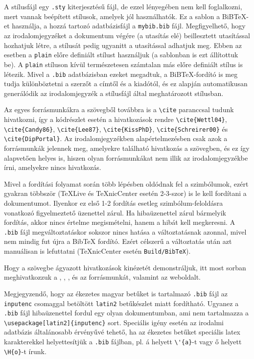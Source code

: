A stílusfájl egy \verb+.sty+ kiterjesztésű fájl, de ezzel lényegében nem kell foglalkozni, mert vannak beépített stílusok, amelyek jól használhatók. Ez a sablon a BiB\TeX-et használja, a hozzá tartozó adatbázisfájl a \verb+mybib.bib+ fájl. Megfigyelhető, hogy az irodalomjegyzéket a dokumentum végére (a \verb++ utasítás elé) beillesztett \verb++ utasítással hozhatjuk létre, a stílusát pedig ugyanitt a  \verb++ utasítással adhatjuk meg. Ebben az esetben a \verb+plain+ előre definiált stílust használjuk (a sablonban is ezt állítottuk be). A \verb+plain+ stíluson kívül természetesen számtalan más előre definiált stílus is létezik. Mivel a \verb+.bib+ adatbázisban ezeket megadtuk, a BiB\TeX-fordító is meg tudja különböztetni a szerzőt a címtől és a kiadótól, és ez alapján automatikusan generálódik az irodalomjegyzék a stílusfájl által meghatározott stílusban.

Az egyes forrásmunkákra a szövegből továbbra is a \verb+\cite+ paranccsal tudunk hivatkozni, így a  kódrészlet esetén a hivatkozások rendre \verb+\cite{Wettl04}+, \verb+\cite{Candy86}+, \verb+\cite{Lee87}+, \verb+\cite{KissPhD}+, \verb+\cite{Schreirer00}+ és \verb+\cite{DipPortal}+. Az irodalomjegyzékben alapértelmezésben csak azok a forrásmunkák jelennek meg, amelyekre található hivatkozás a szövegben, és ez így alapvetően helyes is, hiszen olyan forrásmunkákat nem illik az irodalomjegyzékbe írni, amelyekre nincs hivatkozás.

Mivel a fordítási folyamat során több lépésben oldódnak fel a szimbólumok, ezért gyakran többször (TeXLive és TeXnicCenter esetén 2-3-szor) is le kell fordítani a dokumentumot. Ilyenkor ez első 1-2 fordítás esetleg szimbólum-feloldásra vonatkozó figyelmeztető üzenettel zárul. Ha hibaüzenettel zárul bármelyik fordítás, akkor nincs értelme megismételni, hanem a hibát kell megkeresni. A \verb+.bib+ fájl megváltoztatáskor sokszor nincs hatása a változtatásnak azonnal, mivel nem mindig fut újra a BibTeX fordító. Ezért célszerű a változtatás után azt manuálisan is lefuttatni (TeXnicCenter esetén \verb+Build/BibTeX+).

Hogy a szövegbe ágyazott hivatkozások kinézetét demonstráljuk, itt most sorban meghivatkozzuk a \cite{Wettl04}, \cite{Candy86}, \cite{Lee87}, \cite{KissPhD} és az \cite{Schreier00} forrásmunkát, valamint az \cite{DipPortal} weboldalt.

Megjegyzendő, hogy az ékezetes magyar betűket is tartalmazó \verb+.bib+ fájl az \verb+inputenc+ csomaggal betöltött \verb+latin2+ betűkészlet miatt fordítható. Ugyanez a \verb+.bib+ fájl hibaüzenettel fordul egy olyan dokumentumban, ami nem tartalmazza a \verb+\usepackage[latin2]{inputenc}+ sort. Speciális igény esetén az irodalmi adatbázis általánosabb érvényűvé tehető, ha az ékezetes betűket speciális latex karakterekkel helyettesítjük a \verb+.bib+ fájlban, pl. á helyett \verb+\'{a}+-t vagy ő helyett \verb+\H{o}+-t írunk. 

